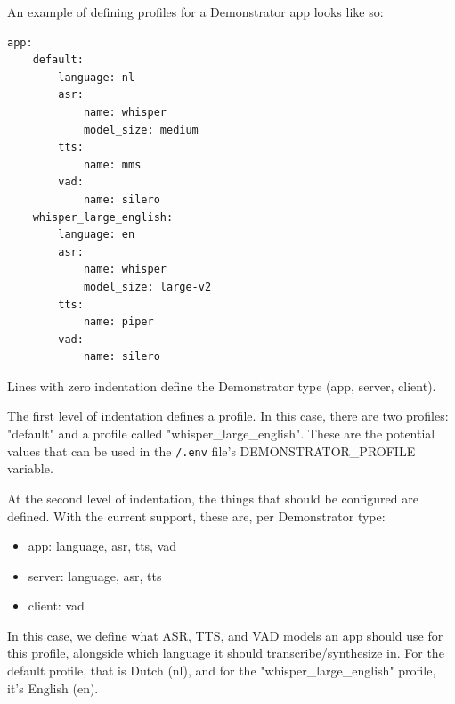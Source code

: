 An example of defining profiles for a Demonstrator app looks like so:
\begin{lstlisting}
app:
    default:
        language: nl
        asr:
            name: whisper
            model_size: medium
        tts:
            name: mms
        vad:
            name: silero
    whisper_large_english:
        language: en
        asr:
            name: whisper
            model_size: large-v2
        tts:
            name: piper
        vad:
            name: silero
\end{lstlisting}

Lines with zero indentation define the Demonstrator type (app, server, client).

The first level of indentation defines a profile.
In this case, there are two profiles: "default" and a profile called "whisper\_large\_english".
These are the potential values that can be used in the \texttt{/.env} file's DEMONSTRATOR\_PROFILE variable.

At the second level of indentation, the things that should be configured are defined.
With the current support, these are, per Demonstrator type:
\begin{itemize}
    \item app: language, asr, tts, vad
    \item server: language, asr, tts
    \item client: vad
\end{itemize}
In this case, we define what ASR, TTS, and VAD models an app should use for this profile, alongside which language it should transcribe/synthesize in.
For the default profile, that is Dutch (nl), and for the "whisper\_large\_english" profile, it's English (en).

